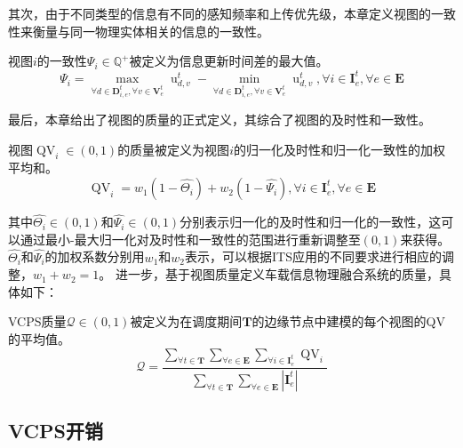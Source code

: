 其次，由于不同类型的信息有不同的感知频率和上传优先级，本章定义视图的一致性来衡量与同一物理实体相关的信息的一致性。
\begin{definition}
视图$i$的一致性$\Psi_{i} \in \mathbb{Q}^{+}$被定义为信息更新时间差的最大值。
\begin{equation}
    \Psi_{i}=\max_{\forall d \in \mathbf{D}_{i, e}^{t}, \forall v \in \mathbf{V}_{e}^{t}} {\operatorname{u}_{d, v}^t} - \min_{\forall d \in \mathbf{D}_{i, e}^{t}, \forall v \in \mathbf{V}_{e}^{t}} {\operatorname{u}_{d, v}^t} , \forall i \in \mathbf{I}_{e}^{t}, \forall e \in \mathbf{E}
\end{equation}
\end{definition}

最后，本章给出了视图的质量的正式定义，其综合了视图的及时性和一致性。
\begin{definition}
视图$\operatorname{QV}_{i} \in (0, 1)$的质量被定义为视图$i$的归一化及时性和归一化一致性的加权平均和。
	\begin{equation}
	    \operatorname{QV}_{i} = w_1 (1 -\hat{\Theta_{i}}) + w_2 (1 - \hat{\Psi_{i}}), \forall i \in \mathbf{I}_{e}^t, \forall e \in \mathbf{E}
	\end{equation}
\end{definition}
\noindent 其中$\hat{\Theta_{i}} \in (0, 1)$和$\hat{\Psi_{i}} \in (0, 1)$分别表示归一化的及时性和归一化的一致性，这可以通过最小-最大归一化对及时性和一致性的范围进行重新调整至$(0, 1)$来获得。
$\hat{\Theta_{i}}$和$\hat{\Psi_{i}}$的加权系数分别用$w_1$和$w_2$表示，可以根据ITS应用的不同要求进行相应的调整，$w_1+w_2=1$。
进一步，基于视图质量定义车载信息物理融合系统的质量，具体如下：
\begin{definition}
VCPS质量$\mathscr{Q} \in (0, 1)$被定义为在调度期间$\mathbf{T}$的边缘节点中建模的每个视图的QV的平均值。
	\begin{equation}
		\mathscr{Q}=\frac{\sum_{\forall t \in \mathbf{T}} \sum_{\forall e \in \mathbf{E}} \sum_{\forall i \in \mathbf{I}_e^t} \operatorname{QV}_{i}}{\sum_{\forall t \in \mathbf{T}} \sum_{\forall e \in \mathbf{E}} |\mathbf{I}_e^t| }
	\end{equation}
\end{definition}

\subsection{VCPS开销}

